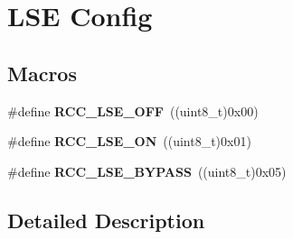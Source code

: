 \hypertarget{group___r_c_c___l_s_e___config}{}\section{L\+SE Config}
\label{group___r_c_c___l_s_e___config}
\subsection*{Macros}
\begin{DoxyCompactItemize}
\item 
\#define {\bfseries R\+C\+C\+\_\+\+L\+S\+E\+\_\+\+O\+FF}~((uint8\+\_\+t)0x00)\hypertarget{group___r_c_c___l_s_e___config_ga6645c27708d0cad1a4ab61d2abb24c77}{}\label{group___r_c_c___l_s_e___config_ga6645c27708d0cad1a4ab61d2abb24c77}

\item 
\#define {\bfseries R\+C\+C\+\_\+\+L\+S\+E\+\_\+\+ON}~((uint8\+\_\+t)0x01)\hypertarget{group___r_c_c___l_s_e___config_gac981ea636c2f215e4473901e0912f55a}{}\label{group___r_c_c___l_s_e___config_gac981ea636c2f215e4473901e0912f55a}

\item 
\#define {\bfseries R\+C\+C\+\_\+\+L\+S\+E\+\_\+\+B\+Y\+P\+A\+SS}~((uint8\+\_\+t)0x05)\hypertarget{group___r_c_c___l_s_e___config_gaad580157edbae878edbcc83c5a68e767}{}\label{group___r_c_c___l_s_e___config_gaad580157edbae878edbcc83c5a68e767}

\end{DoxyCompactItemize}


\subsection{Detailed Description}
